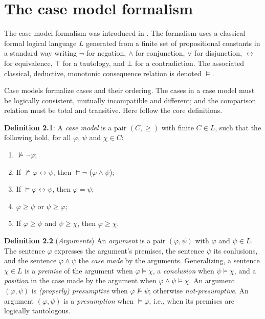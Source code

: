 \documentclass{IOS-Book-Article}
\begin{document}
\section{The case model formalism}
\label{sec:cm}

\noindent The case model formalism was introduced in \citep{Verheij2016Correct}. The formalism uses a classical formal logical  language $L$ generated from a finite set of propositional constants in a standard way writing $\neg$ for negation, $\wedge$ for conjunction, $\vee$ for disjunction, $\leftrightarrow$ for equivalence, $\top$ for a tautology, and $\bot$ for a contradiction. The associated classical, deductive, monotonic consequence relation is denoted $\vDash$.  

Case models formalize cases and their ordering. The cases in a case model must be logically consistent, mutually incompatible and different; and the comparison relation must be total and transitive. Here follow the core definitions.

\textbf{Definition 2.1}: A \textit{case model} is a pair $(C,  \geq)$ with finite $C \in L$, such that the following hold, for all $\varphi$, $\psi$ and $\chi \in C$: 
\begin{enumerate}
\item $\not \vDash \neg \varphi$;
\item If $\not \vDash \varphi \leftrightarrow \psi$, then $\vDash \neg$ ($\varphi \wedge \psi$);
\item If $\vDash \varphi \leftrightarrow \psi$, then $\varphi = \psi$;
\item $\varphi \geq \psi$ or $\psi \geq \varphi$;
\item If $\varphi \geq \psi$ and $\psi \geq \chi$, then $\varphi \geq \chi$.
\end{enumerate}

\textbf{Definition 2.2} (\textit{Arguments}) An \textit{argument} is a pair $(\varphi, \psi)$ with $\varphi$ and $\psi \in L$. The sentence $\varphi$ expresses the argument's premises, the sentence $\psi$ its conlusions, and the sentence $\varphi \wedge \psi$ the \textit{case made} by the arguments. Generalizing, a sentence $\chi \in L$ is a \textit{premise} of the argument when $\varphi \vDash \chi$, a \textit{conclusion} when $\psi \vDash \chi$, and a \textit{position} in the case made by the argument when $\varphi \wedge \psi \vDash \chi$. An argument $(\varphi, \psi)$ is \textit{(properly) presumptive} when $\varphi \not \vDash \psi$; otherwise \textit{not-presumptive}. An argument $(\varphi, \psi)$ is a \textit{presumption} when $\vDash \varphi$, i.e., when its premises are logically tautologous.
\end{document}
